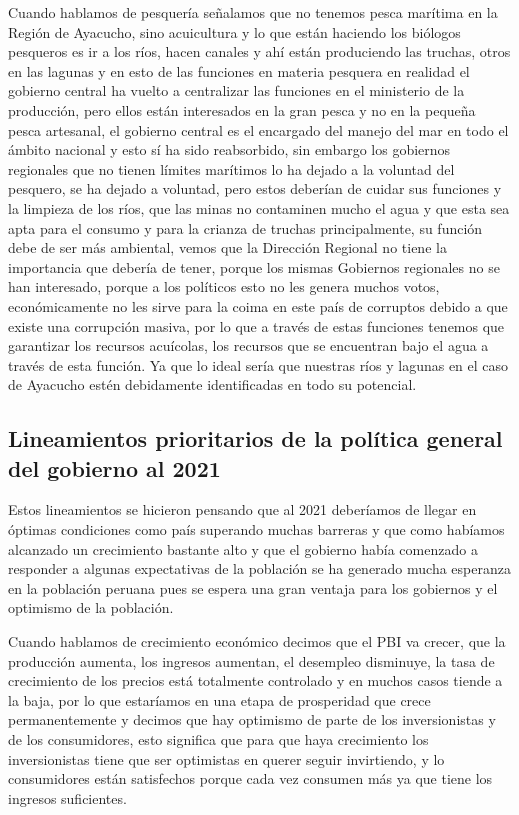 \documentclass[
  jou,
  floatsintext,
  longtable,
  a4paper,
  nolmodern,
  notxfonts,
  notimes,
  12pt,
  colorlinks=true,linkcolor=blue,citecolor=blue,urlcolor=blue]{apa7}
\begin{document}
Cuando hablamos de pesquería señalamos que no tenemos pesca marítima en
la Región de Ayacucho, sino acuicultura y lo que están haciendo los
biólogos pesqueros es ir a los ríos, hacen canales y ahí están
produciendo las truchas, otros en las lagunas y en esto de las funciones
en materia pesquera en realidad el gobierno central ha vuelto a
centralizar las funciones en el ministerio de la producción, pero ellos
están interesados en la gran pesca y no en la pequeña pesca artesanal,
el gobierno central es el encargado del manejo del mar en todo el ámbito
nacional y esto sí ha sido reabsorbido, sin embargo los gobiernos
regionales que no tienen límites marítimos lo ha dejado a la voluntad
del pesquero, se ha dejado a voluntad, pero estos deberían de cuidar sus
funciones y la limpieza de los ríos, que las minas no contaminen mucho
el agua y que esta sea apta para el consumo y para la crianza de truchas
principalmente, su función debe de ser más ambiental, vemos que la
Dirección Regional no tiene la importancia que debería de tener, porque
los mismas Gobiernos regionales no se han interesado, porque a los
políticos esto no les genera muchos votos, económicamente no les sirve
para la coima en este país de corruptos debido a que existe una
corrupción masiva, por lo que a través de estas funciones tenemos que
garantizar los recursos acuícolas, los recursos que se encuentran bajo
el agua a través de esta función. Ya que lo ideal sería que nuestras
ríos y lagunas en el caso de Ayacucho estén debidamente identificadas en
todo su potencial.

\subsection{Lineamientos prioritarios de la política general del
gobierno al
2021}\label{lineamientos-prioritarios-de-la-poluxedtica-general-del-gobierno-al-2021}

Estos lineamientos se hicieron pensando que al 2021 deberíamos de llegar
en óptimas condiciones como país superando muchas barreras y que como
habíamos alcanzado un crecimiento bastante alto y que el gobierno había
comenzado a responder a algunas expectativas de la población se ha
generado mucha esperanza en la población peruana pues se espera una gran
ventaja para los gobiernos y el optimismo de la población.

Cuando hablamos de crecimiento económico decimos que el PBI va crecer,
que la producción aumenta, los ingresos aumentan, el desempleo
disminuye, la tasa de crecimiento de los precios está totalmente
controlado y en muchos casos tiende a la baja, por lo que estaríamos en
una etapa de prosperidad que crece permanentemente y decimos que hay
optimismo de parte de los inversionistas y de los consumidores, esto
significa que para que haya crecimiento los inversionistas tiene que ser
optimistas en querer seguir invirtiendo, y lo consumidores están
satisfechos porque cada vez consumen más ya que tiene los ingresos
suficientes.
\end{document}
